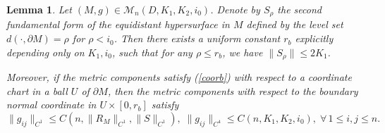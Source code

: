 \documentclass[11pt,letterpaper]{amsart}
\numberwithin{equation}{section}
\theoremstyle{definition}
\theoremstyle{plain}
\theoremstyle{definition}
\theoremstyle{plain}
\theoremstyle{definition}
\theoremstyle{plain}
\newtheorem{riccati}{Lemma}[section]
\begin{document}
\begin{riccati}\label{riccati}
Let $(M,g)\in \mathcal{M}_n(D,K_1,K_2,i_0)$. Denote by $S_{\rho}$ the second fundamental form of the equidistant hypersurface in $M$ defined by the level set $d(\cdot,\partial M)=\rho$ for $\rho<i_0$. Then there exists a uniform constant $r_b$ explicitly depending only on $K_1,i_0$, such that for any $\rho\leqslant r_b$, we have $\|S_{\rho}\|\leqslant 2K_1$.

Moreover, if the metric components satisfy (\ref{coorb}) with respect to a coordinate chart in a ball $U$ of $\partial M$, then the metric components with respect to the boundary normal coordinate in $U\times [0,r_b]$ satisfy
$$\|g_{ij}\|_{C^1}\leqslant C(n,\|R_M\|_{C^1},\|S\|_{C^1}),\; \|g_{ij}\|_{C^4}\leqslant C(n,K_1,K_2,i_0),\; \forall \, 1\leqslant i,j\leqslant n.$$
\end{riccati}
\end{document}
